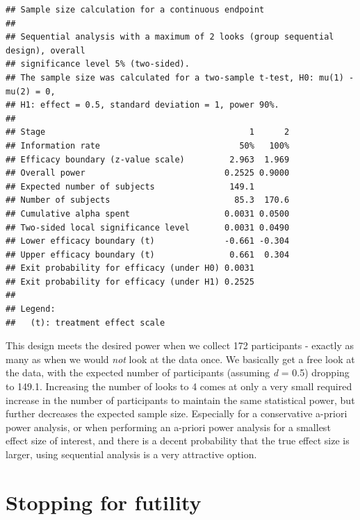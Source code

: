 \documentclass[
  oneside]{krantz}
\begin{document}
\begin{verbatim}
## Sample size calculation for a continuous endpoint
## 
## Sequential analysis with a maximum of 2 looks (group sequential design), overall 
## significance level 5% (two-sided).
## The sample size was calculated for a two-sample t-test, H0: mu(1) - mu(2) = 0, 
## H1: effect = 0.5, standard deviation = 1, power 90%.
## 
## Stage                                         1      2 
## Information rate                            50%   100% 
## Efficacy boundary (z-value scale)         2.963  1.969 
## Overall power                            0.2525 0.9000 
## Expected number of subjects               149.1 
## Number of subjects                         85.3  170.6 
## Cumulative alpha spent                   0.0031 0.0500 
## Two-sided local significance level       0.0031 0.0490 
## Lower efficacy boundary (t)              -0.661 -0.304 
## Upper efficacy boundary (t)               0.661  0.304 
## Exit probability for efficacy (under H0) 0.0031 
## Exit probability for efficacy (under H1) 0.2525 
## 
## Legend:
##   (t): treatment effect scale
\end{verbatim}

This design meets the desired power when we collect 172 participants - exactly as many as when we would \emph{not} look at the data once. We basically get a free look at the data, with the expected number of participants (assuming \emph{d} = 0.5) dropping to 149.1. Increasing the number of looks to 4 comes at only a very small required increase in the number of participants to maintain the same statistical power, but further decreases the expected sample size. Especially for a conservative a-priori power analysis, or when performing an a-priori power analysis for a smallest effect size of interest, and there is a decent probability that the true effect size is larger, using sequential analysis is a very attractive option.

\hypertarget{stopping-for-futility}{%
\section{Stopping for futility}\label{stopping-for-futility}}
\end{document}
